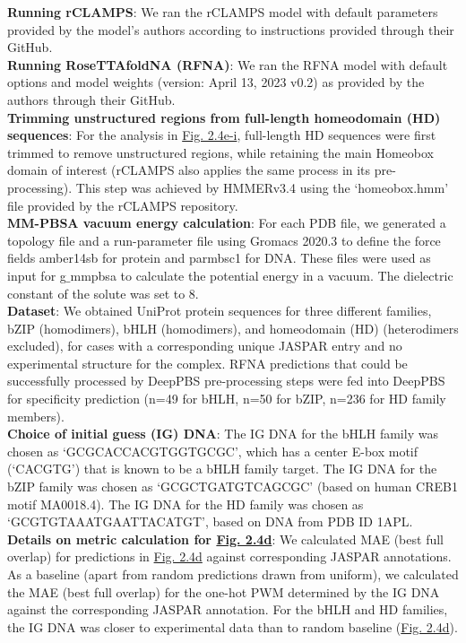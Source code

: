 \textbf{Running rCLAMPS}: We ran the rCLAMPS model with default parameters provided by the model’s authors according to instructions provided through their GitHub.
\\
\textbf{Running RoseTTAfoldNA (RFNA)}: We ran the RFNA model with default options and model weights (version: April 13, 2023 v0.2) as provided by the authors through their GitHub.
\\
\textbf{Trimming unstructured regions from full-length homeodomain (HD) sequences}: For the analysis in \hyperref[fig:pdna3]{Fig. 2.4e-i}, full-length HD sequences were first trimmed to remove unstructured regions, while retaining the main Homeobox domain of interest (rCLAMPS also applies the same process in its pre-processing). This step was achieved by HMMERv3.4 \citep{Finn2011} using the ‘homeobox.hmm’ file provided by the rCLAMPS repository. 
\\
\textbf{MM-PBSA vacuum energy calculation}: For each PDB file, we generated a topology file and a run-parameter file using Gromacs 2020.3 to define the force fields amber14sb for protein and parmbsc1 for DNA. These files were used as input for g$\_$mmpbsa to calculate the potential energy in a vacuum. The dielectric constant of the solute was set to 8. 
\\
\textbf{Dataset}: We obtained UniProt protein sequences for three different families, bZIP (homodimers), bHLH (homodimers), and homeodomain (HD) (heterodimers excluded), for cases with a corresponding unique JASPAR entry and no experimental structure for the complex. RFNA predictions that could be successfully processed by DeepPBS pre-processing steps were fed into DeepPBS for specificity prediction (n=49 for bHLH, n=50 for bZIP, n=236 for HD family members).
\\
\textbf{Choice of initial guess (IG) DNA}: The IG DNA for the bHLH family was chosen as ‘GCGCACCACGTGGTGCGC’, which has a center E-box motif (‘CACGTG’) that is known \citep{demartin2021} to be a bHLH family target. The IG DNA for the bZIP family was chosen as ‘GCGCTGATGTCAGCGC’ (based on human CREB1 motif MA0018.4). The IG DNA for the HD family was chosen as ‘GCGTGTAAATGAATTACATGT’, based on DNA from PDB ID 1APL. 
\\
\textbf{Details on metric calculation for \hyperref[fig:pdna3]{Fig. 2.4d}}: We calculated MAE (best full overlap) for predictions in \hyperref[fig:pdna3]{Fig. 2.4d} against corresponding JASPAR annotations. As a baseline (apart from random predictions drawn from uniform), we calculated the MAE (best full overlap) for the one-hot PWM determined by the IG DNA against the corresponding JASPAR annotation. For the bHLH and HD families, the IG DNA was closer to experimental data than to random baseline (\hyperref[fig:pdna3]{Fig. 2.4d}).
